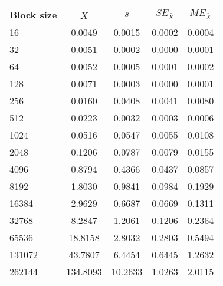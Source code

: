 \begin{tabular}{lcccc}\toprule
{\small Block size} & $\bar{X}$ & $s$ & $SE_{\bar{X}}$ & $ME_{\bar{X}}$ \\\midrule
16 & 0.0049 & 0.0015 & 0.0002 & 0.0004\\
32 & 0.0051 & 0.0002 & 0.0000 & 0.0001\\
64 & 0.0052 & 0.0005 & 0.0001 & 0.0002\\
128 & 0.0071 & 0.0003 & 0.0000 & 0.0001\\
256 & 0.0160 & 0.0408 & 0.0041 & 0.0080\\
512 & 0.0223 & 0.0032 & 0.0003 & 0.0006\\
1024 & 0.0516 & 0.0547 & 0.0055 & 0.0108\\
2048 & 0.1206 & 0.0787 & 0.0079 & 0.0155\\
4096 & 0.8794 & 0.4366 & 0.0437 & 0.0857\\
8192 & 1.8030 & 0.9841 & 0.0984 & 0.1929\\
16384 & 2.9629 & 0.6687 & 0.0669 & 0.1311\\
32768 & 8.2847 & 1.2061 & 0.1206 & 0.2364\\
65536 & 18.8158 & 2.8032 & 0.2803 & 0.5494\\
131072 & 43.7807 & 6.4454 & 0.6445 & 1.2632\\
262144 & 134.8093 & 10.2633 & 1.0263 & 2.0115\\
\bottomrule
\end{tabular}
